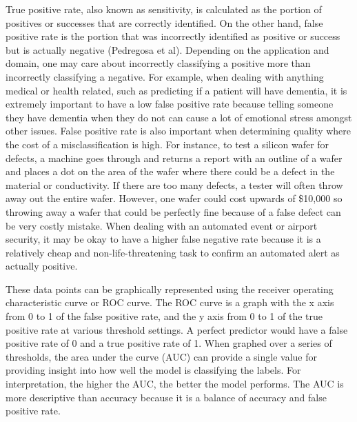\documentclass{llncs}
\begin{document}
\noindent 
True positive rate, also known as sensitivity, is calculated as the portion of positives or successes that are correctly identified. On the other hand, false positive rate is the portion that was incorrectly identified as positive or success but is actually negative (Pedregosa et al). Depending on the application and domain, one may care about incorrectly classifying a positive more than incorrectly classifying a negative.  For example, when dealing with anything medical or health related, such as predicting if a patient will have dementia, it is extremely important to have a low false positive rate because telling someone they have dementia when they do not can cause a lot of emotional stress amongst other issues.  False positive rate is also important when determining quality where the cost of a misclassification is high.  For instance, to test a silicon wafer for defects, a machine goes through and returns a report with an outline of a wafer and places a dot on the area of the wafer where there could be a defect in the material or conductivity.  If there are too many defects, a tester will often throw away out the entire wafer.  However, one wafer could cost upwards of \$10,000 so throwing away a wafer that could be perfectly fine because of a false defect can be very costly mistake.  When dealing with an automated event or airport security, it may be okay to have a higher false negative rate because it is a relatively cheap and non-life-threatening task to confirm an automated alert as actually positive.


\noindent 
These data points can be graphically represented using the receiver operating characteristic curve or ROC curve.  The ROC curve is a graph with the x axis from 0 to 1 of the false positive rate, and the y axis from 0 to 1 of the true positive rate at various threshold settings.  A perfect predictor would have a false positive rate of 0 and a true positive rate of 1.  When graphed over a series of thresholds, the area under the curve (AUC) can provide a single value for providing insight into how well the model is classifying the labels. For interpretation, the higher the AUC, the better the model performs. The AUC is more descriptive than accuracy because it is a balance of accuracy and false positive rate.
\end{document}
